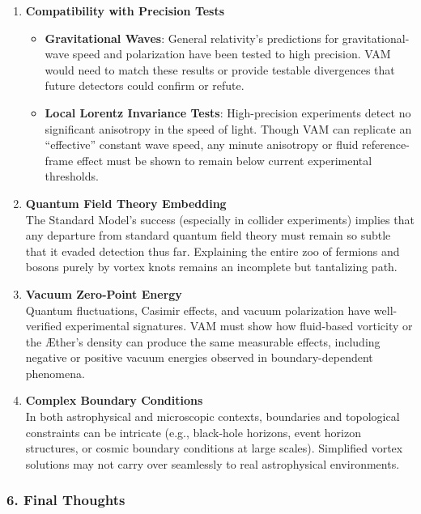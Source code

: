 \begin{enumerate}
    \item \textbf{Compatibility with Precision Tests}
    \begin{itemize}
        \item \textbf{Gravitational Waves}: General relativity’s predictions for gravitational-wave speed and polarization have been tested to high precision. VAM would need to match these results or provide testable divergences that future detectors could confirm or refute.
        \item \textbf{Local Lorentz Invariance Tests}: High-precision experiments detect no significant anisotropy in the speed of light. Though VAM can replicate an “effective” constant wave speed, any minute anisotropy or fluid reference-frame effect must be shown to remain below current experimental thresholds.
    \end{itemize}

    \item \textbf{Quantum Field Theory Embedding} \\
    The Standard Model’s success (especially in collider experiments) implies that any departure from standard quantum field theory must remain so subtle that it evaded detection thus far. Explaining the entire zoo of fermions and bosons purely by vortex knots remains an incomplete but tantalizing path.

    \item \textbf{Vacuum Zero-Point Energy} \\
    Quantum fluctuations, Casimir effects, and vacuum polarization have well-verified experimental signatures. VAM must show how fluid-based vorticity or the Æther’s density can produce the same measurable effects, including negative or positive vacuum energies observed in boundary-dependent phenomena.

    \item \textbf{Complex Boundary Conditions} \\
    In both astrophysical and microscopic contexts, boundaries and topological constraints can be intricate (e.g., black-hole horizons, event horizon structures, or cosmic boundary conditions at large scales). Simplified vortex solutions may not carry over seamlessly to real astrophysical environments.
\end{enumerate}

\subsubsection*{6. Final Thoughts}

